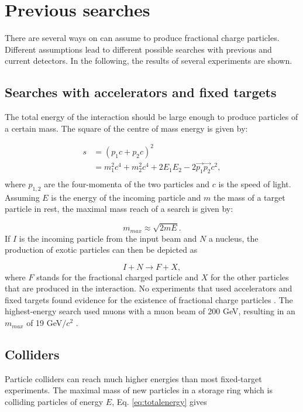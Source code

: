 \section{Previous searches}
\label{sec:prevsearches}
There are several ways on can assume to produce fractional charge particles. Different assumptions lead to different possible searches with previous and current detectors. In the following, the results of several experiments are shown. 

\subsection{Searches with accelerators and fixed targets}
The total energy of the interaction should be large enough to produce particles of a certain mass. The square of the centre of mass energy is given by:

\begin{equation}
\label{eq:totalenergy}
\begin{split}
s &= \left(p_1c + p_2c\right)^2\\
&= m_1^2c^4 + m_2^2c^4 + 2E_1E_2 - 2\vec{p_1}\vec{p_2}c^2,\\
\end{split}
\end{equation}
where $p_{1,2}$ are the four-momenta of the two particles and $c$ is the speed of light.
Assuming $E$ is the energy of the incoming particle and $m$ the mass of a target particle in rest, the maximal mass reach of a search is given by:

\begin{equation}
m_{max} \approx \sqrt{2 m E}.
\end{equation}
If $I$ is the incoming particle from the input beam and $N$ a nucleus, the production of exotic particles can then be depicted as

\begin{equation}
I + N \rightarrow F + X,
\end{equation}
where $F$ stands for the fractional charged particle and $X$ for the other particles that are produced in the interaction. No experiments that used accelerators and fixed targets found evidence for the existence of fractional charge particles \cite{Lyons:1984pw}. The highest-energy search used muons with a muon beam of 200 GeV, resulting in an $m_{max}$ of 19 GeV$/c^2$ \cite{Aubert:1983jy}.
\subsection{Colliders}
Particle colliders can reach much higher energies than most fixed-target experiments. The maximal mass of new particles in a storage ring which is colliding particles of energy $E$, Eq. \ref{eq:totalenergy} gives

